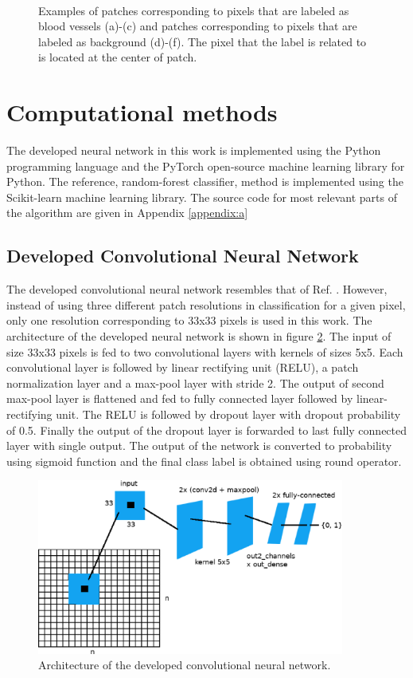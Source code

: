 \documentclass[aps,prb,10pt,twocolumn,groupedaddress]{revtex4-1}
\begin{document}
\begin{figure}[!t]
\begin{subfigure}[]{0.22\textwidth}
    	\caption{}
    \end{subfigure}\\
	\caption{Examples of patches corresponding to pixels that are labeled as blood vessels (a)-(c) and patches corresponding to pixels that are labeled as background (d)-(f). The pixel that the label is related to is located at the center of patch.}
	\label{fig:example_patches}
\end{figure}


\section{Computational methods}
\label{sec:computational_methods}
The developed neural network in this work is implemented using the Python programming language and the PyTorch open-source machine learning library for Python. The reference, random-forest classifier, method is implemented using the Scikit-learn machine learning library. The source code for most relevant parts of the algorithm are given in Appendix \ref{appendix:a}
\subsection{Developed Convolutional Neural Network}
\label{sec:computational_methods_developed_network}
The developed convolutional neural network resembles that of Ref. \cite{tan}. However, instead of using three different patch resolutions in classification for a given pixel, only one resolution corresponding to 33x33 pixels is used in this work. The architecture of the developed neural network is shown in figure \ref{fig:net}. 
The input of size 33x33 pixels is fed to two convolutional layers with kernels of sizes 5x5. Each convolutional layer is followed by linear rectifying unit (RELU), a patch normalization layer and a max-pool layer with stride 2. The output of second max-pool layer is flattened and fed to fully connected layer followed by linear-rectifying unit. The RELU is followed by dropout layer with dropout probability of 0.5. Finally the output of the dropout layer is forwarded to last fully connected layer with single output. The output of the network is converted to probability using sigmoid function and the final class label is obtained using round operator.
\begin{figure}[!t]
	\centering
	\includegraphics[width=0.9\textwidth]{images/net_cropped.eps}
	\caption{Architecture of the developed convolutional neural network.}
	\label{fig:net}
\end{figure}
\end{document}
